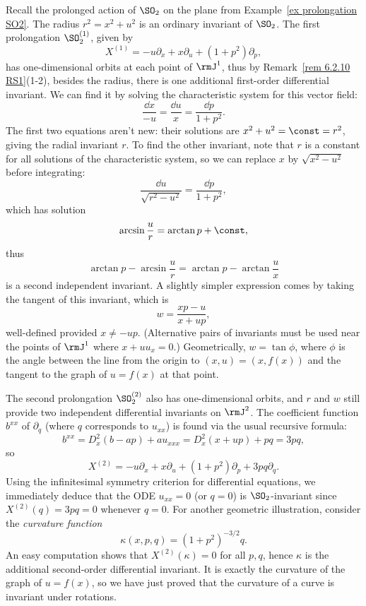 \begin{example}\label{ex 5.2 Olver}
    Recall the prolonged action of $\SO_2$ on the plane from Example~\ref{ex prolongation SO2}. The radius $r^2=x^2+u^2$ is an ordinary invariant of $\SO_2$. The first prolongation $\SO_2^{(1)}$, given by 
    \[X^{(1)}=-u\partial_x+x\partial_u+(1+p^2)\partial_p,\] 
    has one-dimensional orbits at each point of $\rmJ^1$, thus by Remark~\ref{rem 6.2.10 RS1}(1-2), besides the radius, there is one additional first-order differential invariant. We can find it by solving the characteristic system for this vector field:
    \[\frac{\dd x}{-u}=\frac{\dd u}{x}=\frac{\dd p}{1+p^2}.\]
    The first two equations aren't new: their solutions are $x^2+u^2=\const=r^2$, giving the radial invariant $r$. To find the other invariant, note that $r$ is a constant for all solutions of the characteristic system, so we can replace $x$ by $\sqrt{x^2-u^2}$ before integrating:
    \[\frac{\dd u}{\sqrt{r^2-u^2}}=\frac{\dd p}{1+p^2},\]
    which has solution 
    \[\arcsin\frac{u}{r}=\arctan p+\const,\]
    thus 
    \[\arctan p-\arcsin\frac{u}{r}=\arctan p-\arctan\frac{u}{x}\]
    is a second independent invariant. A slightly simpler expression comes by taking the tangent of this invariant, which is
    \[w=\frac{xp-u}{x+up},\]
    well-defined provided $x\neq -up$. (Alternative pairs of invariants must be used near the points of $\rmJ^1$ where $x+uu_x=0$.) Geometrically, $w=\tan\phi$, where $\phi$ is the angle between the line from the origin to $(x,u)=(x,f(x))$ and the tangent to the graph of $u=f(x)$ at that point. 
    
    The second prolongation $\SO_2^{(2)}$ also has one-dimensional orbits, and $r$ and $w$ still provide two independent differential invariants on $\rmJ^2$. The coefficient function $b^{xx}$ of $\partial_q$ (where $q$ corresponds to $u_{xx}$) is found via the usual recursive formula:
    \[b^{xx}=D_x^2(b-a p)+au_{xxx}=D_x^2(x+up)+pq=3pq,\]
    so 
    \[X^{(2)}=-u\partial_x+x\partial_u+(1+p^2)\partial_p+3pq\partial_q.\]
    Using the infinitesimal symmetry criterion for differential equations, we immediately deduce that the ODE $u_{xx}=0$ (or $q=0$) is $\SO_2$-invariant since $X^{(2)}(q)=3pq=0$ whenever $q=0$. For another geometric illustration, consider the \emph{curvature function} 
    \[\kappa(x,p,q)=(1+p^2)^{-3/2}q.\]
    An easy computation shows that $X^{(2)}(\kappa)=0$ for all $p,q$, hence $\kappa$ is the additional second-order differential invariant. It is exactly the curvature of the graph of $u=f(x)$, so we have just proved that the curvature of a curve is invariant under rotations.
\end{example}


